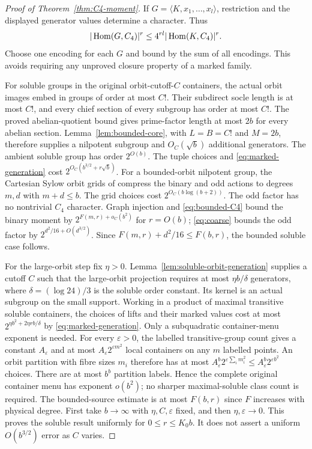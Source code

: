 \begin{proof}[Proof of Theorem~\ref{thm:C4-moment}]
If $G=\langle K,x_1,\ldots,x_l\rangle$, restriction and the displayed
generator values determine a character. Thus
\begin{equation}\label{eq:marked-generation}
 |\operatorname{Hom}(G,C_4)|^r\leq4^{rl}|\operatorname{Hom}(K,C_4)|^r.
\end{equation}
Choose one encoding for each $G$ and bound by the sum of all encodings.
This avoids requiring any unproved closure property of a marked family.

For soluble groups in the original orbit-cutoff-$C$ containers,
the actual orbit images embed in groups of order at most $C!$.
Their subdirect socle length is at most $C!$, and every chief section
of every subgroup has order at most $C!$. The proved abelian-quotient
bound gives prime-factor length at most $2b$ for every abelian section.
Lemma~\ref{lem:bounded-core}, with $L=B=C!$ and $M=2b$, therefore
supplies a nilpotent subgroup and $O_C(\sqrt b)$ additional generators. The ambient
soluble group has order $2^{O(b)}$. The tuple choices and
\eqref{eq:marked-generation} cost
$2^{O_C(b^{3/2}+r\sqrt b)}$.
For a bounded-orbit nilpotent group, the Cartesian Sylow orbit grids
of \cite[Lemma 2.7]{RoneyDougalTracey2025} compress the binary and
odd actions to degrees $m,d$ with $m+d\leq b$. The grid choices cost
$2^{O_C(b\log(b+2))}$. The odd factor has no nontrivial $C_4$ character.
Graph injection and \eqref{eq:bounded-C4} bound the binary moment by
$2^{F(m,r)+o_C(b^2)}$ for $r=O(b)$; \eqref{eq:coarse} bounds the
odd factor by $2^{d^2/16+O(d^{3/2})}$. Since
$F(m,r)+d^2/16\leq F(b,r)$, the bounded soluble case follows.

For the large-orbit step fix $\eta>0$. Lemma~\ref{lem:soluble-orbit-generation}
supplies a cutoff $C$ such that the large-orbit projection requires at most
$\eta b/\delta$ generators, where $\delta=(\log24)/3$ is the soluble
order constant. Its kernel is an actual subgroup on the small support.
Working in a product of maximal transitive soluble containers, the
choices of lifts and their marked values cost at most
$2^{\eta b^2+2\eta rb/\delta}$ by \eqref{eq:marked-generation}.
Only a subquadratic container-menu exponent is needed. For every
$\varepsilon>0$, the labelled transitive-group count gives a constant
$A_\varepsilon$ and at most $A_\varepsilon2^{\varepsilon m^2}$ local
containers on any $m$ labelled points. An orbit partition with fibre sizes
$m_i$ therefore has at most
$A_\varepsilon^b2^{\varepsilon\sum_i m_i^2}
 \leq A_\varepsilon^b2^{\varepsilon b^2}$ choices.
There are at most $b^b$ partition labels. Hence the complete original
container menu has exponent $o(b^2)$; no sharper maximal-soluble class
count is required. The bounded-source estimate is at most $F(b,r)$ since
$F$ increases with physical degree. First take $b\to\infty$ with
$\eta,C,\varepsilon$ fixed, and then $\eta,\varepsilon\to0$.
This proves the soluble result uniformly for $0\leq r\leq K_0b$.
It does not assert a uniform $O(b^{3/2})$ error as $C$ varies.


\end{proof}
